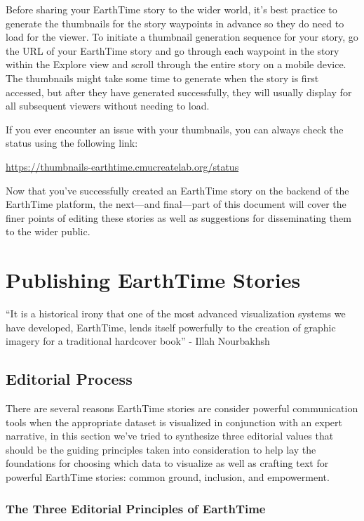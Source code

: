 \documentclass[
]{krantz}
\begin{document}
Before sharing your EarthTime story to the wider world, it's best practice to generate the thumbnails for the story waypoints in advance so they do need to load for the viewer. To initiate a thumbnail generation sequence for your story, go the URL of your EarthTime story and go through each waypoint in the story within the Explore view and scroll through the entire story on a mobile device. The thumbnails might take some time to generate when the story is first accessed, but after they have generated successfully, they will usually display for all subsequent viewers without needing to load.

If you ever encounter an issue with your thumbnails, you can always check the status using the following link:

\url{https://thumbnails-earthtime.cmucreatelab.org/status}

Now that you've successfully created an EarthTime story on the backend of the EarthTime platform, the next---and final---part of this document will cover the finer points of editing these stories as well as suggestions for disseminating them to the wider public.

\hypertarget{part-publishing-earthtime-stories}{%
\part{Publishing EarthTime Stories}\label{part-publishing-earthtime-stories}}

``It is a historical irony that one of the most advanced visualization systems we have developed, EarthTime, lends itself powerfully to the creation of graphic imagery for a traditional hardcover book'' - Illah Nourbakhsh

\hypertarget{editorial-process}{%
\chapter{Editorial Process}\label{editorial-process}}

There are several reasons EarthTime stories are consider powerful communication tools when the appropriate dataset is visualized in conjunction with an expert narrative, in this section we've tried to synthesize three editorial values that should be the guiding principles taken into consideration to help lay the foundations for choosing which data to visualize as well as crafting text for powerful EarthTime stories: common ground, inclusion, and empowerment.

\hypertarget{the-three-editorial-principles-of-earthtime}{%
\section{The Three Editorial Principles of EarthTime}\label{the-three-editorial-principles-of-earthtime}}
\end{document}

